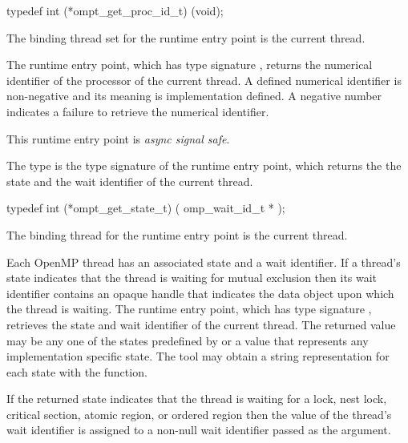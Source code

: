 \format
\begin{ccppspecific}
\begin{omptInquiry}
typedef int (*ompt_get_proc_id_t) (void);
\end{omptInquiry}
\end{ccppspecific}

\binding
The binding thread set for the  runtime entry point
is the current thread.

\descr
The  runtime entry point, which has type signature
, returns the numerical identifier of the processor 
of the current thread. A defined numerical identifier is non-negative and
its meaning is implementation defined. A negative number indicates a failure 
to retrieve the numerical identifier.

This runtime entry point is \emph{async signal safe}.



\label{sec:ompt_get_state_t}
\label{sec:ompt_get_state}

\summary
The  type is the type signature of the 
 runtime entry point, which returns the
the state and the wait identifier of the current thread.

\format
\begin{ccppspecific}
\begin{omptInquiry}
typedef int (*ompt_get_state_t) (
  omp_wait_id_t *
);
\end{omptInquiry}
\end{ccppspecific}

\binding
The binding thread for the  runtime entry point 
is the current thread.

\descr
Each OpenMP thread has an associated state and a wait identifier. If
a thread's state indicates that the thread is waiting for mutual exclusion
then its wait identifier contains an opaque handle that indicates the 
data object upon which the thread is waiting. The  
runtime entry point, which has type signature ,
retrieves the state and wait identifier of the current thread.
The returned value may be any one of the states predefined by 
 or a value that represents any implementation
specific state. The tool may obtain a string representation for each 
state with the  function.

If the returned state indicates that the thread is waiting for a
lock, nest lock, critical section, atomic region, or ordered region
then the value of the thread's wait identifier is assigned to a
non-null wait identifier passed as the  argument.

